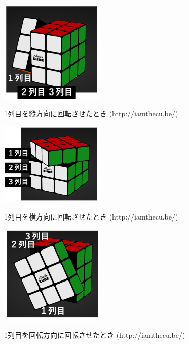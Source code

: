 \documentclass[a4p]{jarticle}
\begin{document}
\begin{figure}[!h]
  \includegraphics[width=5cm]{./tex_pic/tate.jpg}\\
  \captionsetup{labelformat=empty,labelsep=none}
  \caption{1列目を縦方向に回転させたとき (http://iamthecu.be/)}
\end{figure}
\begin{figure}[!h]
  \includegraphics[width=5cm]{./tex_pic/yoko.jpg}\\
  \captionsetup{labelformat=empty,labelsep=none}
  \caption{1列目を横方向に回転させたとき (http://iamthecu.be/)}
\end{figure}
\begin{figure}[!h]
  \includegraphics[width=5cm]{./tex_pic/kai.jpg}\\
  \captionsetup{labelformat=empty,labelsep=none}
  \caption{1列目を回転方向に回転させたとき (http://iamthecu.be/)}
\end{figure}
\end{document}
